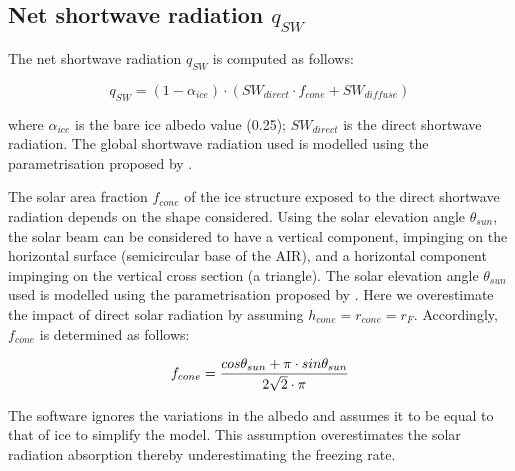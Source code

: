 \documentclass[utf8]{frontiersSCNS}
\begin{document}
\subsection{Net shortwave radiation \texorpdfstring{$q_{SW}$}{Lg}}
\label{sec:SW}

The net shortwave radiation $q_{SW}$ is computed as follows:

\begin{equation} q_{SW} = (1- \alpha_{ice}) \cdot ( SW_{direct} \cdot f_{cone} + SW_{diffuse})
\label{eqn:SW} \end{equation}

where $\alpha_{ice}$ is the bare ice albedo value (0.25); $SW_{direct}$ is the direct shortwave radiation. The
global shortwave radiation used is modelled using the parametrisation proposed by \cite{woolfComputationSolarElevation1968}.

The solar area fraction $f_{cone}$ of the ice structure exposed to the direct shortwave radiation depends on the
shape considered. Using the solar elevation angle $\theta_{sun}$, the solar beam can be considered to have a
vertical component, impinging on the horizontal surface (semicircular base of the AIR), and a horizontal
component impinging on the vertical cross section (a triangle). The solar elevation angle $\theta_{sun}$ used is
modelled using the parametrisation proposed by \cite{woolfComputationSolarElevation1968}. Here we overestimate the impact of direct
solar radiation by assuming $h_{cone} = r_{cone} = r_{F}$. Accordingly, $f_{cone}$ is determined as follows:

\begin{equation}
	\begin{split}
		f_{cone}& =\frac{ cos \theta_{sun} + \pi \cdot sin \theta_{sun} }{2\sqrt{2} \cdot \pi }\\
	\end{split}
	\label{ eqn:f_{cone}}
\end{equation}

The software ignores the variations in the albedo and assumes it to be equal to that of ice to simplify the
model. This assumption overestimates the solar radiation absorption thereby underestimating the freezing rate.

 
\end{document}
